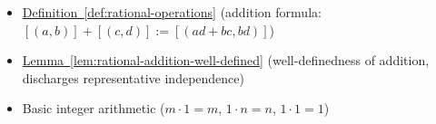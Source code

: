 \begin{dependencies}
\begin{itemize}
  \item \hyperref[def:rational-operations]{Definition~\ref*{def:rational-operations}}
        \textnormal{(addition formula: $[(a,b)]+[(c,d)]:=[(ad+bc,bd)]$)}
  \item \hyperref[lem:rational-addition-well-defined]{Lemma~\ref*{lem:rational-addition-well-defined}}
        \textnormal{(well-definedness of addition, discharges representative independence)}
  \item Basic integer arithmetic ($m\cdot 1 = m$, $1\cdot n = n$, $1\cdot 1 = 1$)
\end{itemize}
\end{dependencies}
